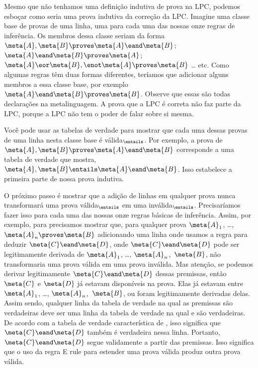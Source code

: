  Mesmo que não tenhamos uma definição indutiva de prova na LPC, podemos esboçar como seria uma prova indutiva da correção da LPC. Imagine uma classe base de provas de uma linha, uma para cada uma das nossas onze regras de inferência. Os membros dessa classe seriam da forma $\meta{A}, \meta{B} \proves  \meta{A} \eand \meta{B}$; $\meta{A} \eand \meta{B} \proves \meta{A}$; $\meta{A} \eor \meta{B}, \enot\meta{A} \proves  \meta{B}$ \ldots{} etc. Como algumas regras têm duas formas diferentes, teríamos que adicionar alguns membros a essa classe base, por exemplo $\meta{A} \eand \meta{B} \proves  \meta{B}$.  Observe que essas são todas declarações na metalinguagem. A prova  que a LPC é correta não faz parte da LPC, porque a LPC não tem o poder de falar sobre si mesma.

Você pode usar as tabelas de verdade para mostrar que cada uma dessas provas de uma linha  nesta classe base é válida$_{\entails}$. Por exemplo, a prova de $\meta{A}, \meta{B} \proves \meta{A} \eand \meta{B}$ corresponde a uma tabela de verdade que mostra, $\meta{A}, \meta{B} \entails  \meta{A} \eand \meta{B}$. Isso estabelece a primeira parte de nossa prova indutiva.  

O próximo passo é mostrar que a adição de linhas em qualquer prova nunca transformará uma prova válida$_{\entails}$ em uma inválida$_{\entails}$. Precisaríamos fazer isso para cada uma das nossas onze regras básicas de inferência. Assim, por exemplo, para   precisamos mostrar que, para qualquer prova $\meta{A}_{1}$, \dots, $\meta{A}_{n} \proves  \meta {B}$ adicionando uma linha onde usamos a  regra  para deduzir $\meta{C} \eand \meta{D}$, onde $\meta{C} \eand \meta{D}$ pode ser legitimamente derivada de $\meta{A}_{1}$, \dots, $\meta{A}_{n}$,~$\meta{B}$,  não transformaria uma prova válida em uma prova inválida. Mas atenção, se podemos derivar legitimamente $\meta{C} \eand \meta{D}$ dessas premissas, então $\meta{C}$ e $\meta{D}$  já estavam disponíveis na prova. Elas já estavam entre $\meta{A}_{1}$, \dots, $\meta{A}_{n}$,~$\meta {B}$, ou foram legitimamente derivadas delas.  Assim sendo, qualquer linha da tabela  de verdade na qual as premissas são verdadeiras deve ser uma linha da tabela de verdade na qual  e  são verdadeiras. De acordo com a tabela de verdade característica de \eand, isso significa que $\meta{C} \eand \meta{D}$ também é verdadeira nessa linha. Portanto,  $\meta{C} \eand \meta{D}$ segue validamente a partir das premissas. Isso significa que o uso da regra {\eand}E rule para estender uma prova válida produz outra prova válida.


